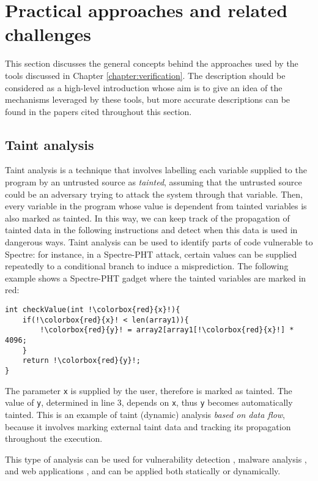 \documentclass[target=mst,aauheader=aics]{thud}
\theoremstyle{definition}
\begin{document}
	\section{Practical approaches and related challenges}
	This section discusses the general concepts behind the approaches used by the tools discussed in Chapter \ref{chapter:verification}. The description should be considered as a high-level introduction whose aim is to give an idea of the mechanisms leveraged by these tools, but more accurate descriptions can be found in the papers cited throughout this section.
	\subsection{Taint analysis}\label{sec:taint}
	Taint analysis is a technique that involves labelling each variable supplied to the program by an untrusted source as \textit{tainted}, assuming that the untrusted source could be an adversary trying to attack the system  through that variable.
	Then, every variable in the program whose value is dependent from tainted variables is also marked as tainted. In this way, we can keep track of the propagation of tainted data in the following instructions and detect when this data is used in dangerous ways. Taint analysis can be used to identify parts of code vulnerable to Spectre: for instance, in a Spectre-PHT attack, certain values can be supplied repeatedly to a conditional branch to induce a misprediction. The following example shows a Spectre-PHT gadget where the tainted variables are marked in red:
	
	\vspace{3mm}
	\begin{minipage}{.6\textwidth}
	\begin{lstlisting}[escapechar=!]
int checkValue(int !\colorbox{red}{x}!){
	if(!\colorbox{red}{x}! < len(array1)){
		!\colorbox{red}{y}! = array2[array1[!\colorbox{red}{x}!] * 4096;
	}
	return !\colorbox{red}{y}!;
}
	\end{lstlisting}
	\end{minipage}

	The parameter \texttt{x} is supplied by the user, therefore is marked as tainted. The value of \texttt{y}, determined in line 3, depends on \texttt{x}, thus \texttt{y} becomes automatically tainted. This is an example of taint (dynamic) analysis \textit{based on data flow}, because it involves marking external taint data and tracking its propagation throughout the execution.
	
	This type of analysis can be used for vulnerability detection \cite{Newsome2005}, malware analysis \cite{Bayer2009} \cite{Yin2007}, and web applications \cite{Balzarotti2008} \cite{NguyenTuong2005}, and can be applied both statically or dynamically.
	
\end{document}

